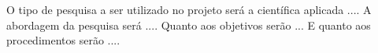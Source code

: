\justify

\hspace{0.5cm} O tipo de pesquisa a ser utilizado no projeto será a científica aplicada ....
A abordagem da pesquisa será ....
Quanto aos objetivos serão ...
E quanto aos procedimentos serão ....